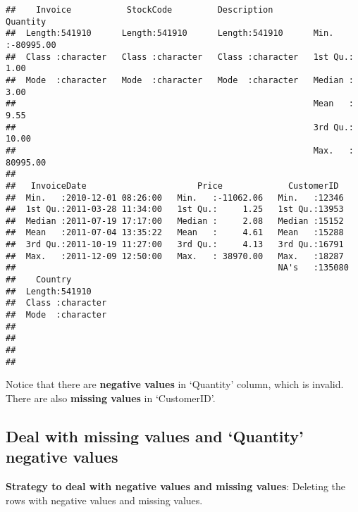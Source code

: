 \documentclass[
]{article}
\newenvironment{Shaded}{\begin{snugshade}}{\end{snugshade}}
\newcommand{\CommentTok}[1]{\textcolor[rgb]{0.56,0.35,0.01}{\textit{#1}}}
\newcommand{\DecValTok}[1]{\textcolor[rgb]{0.00,0.00,0.81}{#1}}
\newcommand{\KeywordTok}[1]{\textcolor[rgb]{0.13,0.29,0.53}{\textbf{#1}}}
\newcommand{\NormalTok}[1]{#1}
\newcommand{\OperatorTok}[1]{\textcolor[rgb]{0.81,0.36,0.00}{\textbf{#1}}}
\newcommand{\StringTok}[1]{\textcolor[rgb]{0.31,0.60,0.02}{#1}}
\begin{document}
\begin{verbatim}
##    Invoice           StockCode         Description           Quantity        
##  Length:541910      Length:541910      Length:541910      Min.   :-80995.00  
##  Class :character   Class :character   Class :character   1st Qu.:     1.00  
##  Mode  :character   Mode  :character   Mode  :character   Median :     3.00  
##                                                           Mean   :     9.55  
##                                                           3rd Qu.:    10.00  
##                                                           Max.   : 80995.00  
##                                                                              
##   InvoiceDate                      Price             CustomerID    
##  Min.   :2010-12-01 08:26:00   Min.   :-11062.06   Min.   :12346   
##  1st Qu.:2011-03-28 11:34:00   1st Qu.:     1.25   1st Qu.:13953   
##  Median :2011-07-19 17:17:00   Median :     2.08   Median :15152   
##  Mean   :2011-07-04 13:35:22   Mean   :     4.61   Mean   :15288   
##  3rd Qu.:2011-10-19 11:27:00   3rd Qu.:     4.13   3rd Qu.:16791   
##  Max.   :2011-12-09 12:50:00   Max.   : 38970.00   Max.   :18287   
##                                                    NA's   :135080  
##    Country         
##  Length:541910     
##  Class :character  
##  Mode  :character  
##                    
##                    
##                    
## 
\end{verbatim}

Notice that there are \textbf{negative values} in `Quantity' column,
which is invalid. There are also \textbf{missing values} in
`CustomerID'.

\hypertarget{deal-with-missing-values-and-quantity-negative-values}{%
\subsection{Deal with missing values and `Quantity' negative
values}\label{deal-with-missing-values-and-quantity-negative-values}}

\textbf{Strategy to deal with negative values and missing values}:
Deleting the rows with negative values and missing values.

\begin{Shaded}
\end{Shaded}
\end{document}
